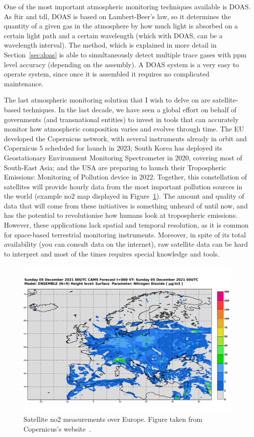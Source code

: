 One of the most important atmospheric monitoring techniques available is
\gls{DOAS}. As \gls{ftir} and \gls{tdl}, \gls{DOAS} is based on
Lambert-Beer's law, so it determines the quantity of a given gas in the
atmosphere by how much light is absorbed on a certain light path and a
certain wavelength (which with \gls{DOAS}, can be a wavelength
interval). The method, which is explained in more detail in
Section~\ref{sec:doas} is able to simultaneously detect multiple trace
gases with ppm level accuracy (depending on the assembly). A \gls{DOAS}
system is a very easy to operate system, since once it is assembled it
requires no complicated maintenance.

The last atmospheric monitoring solution that I wish to delve on are
satellite-based techniques. In the last decade, we have seen a global
effort on behalf of governments (and transnational entities) to invest in
tools that can accurately monitor how atmospheric composition varies and
evolves through time. The EU developed the Copernicus network, with
several instruments already in orbit and Copernicus 5 scheduled for
launch in 2023; South Korea has deployed its Geostationary Environment
Monitoring Spectrometer in 2020, covering most of South-East Asia; and
the USA are preparing to launch their Tropospheric Emissions: Monitoring
of Pollution device in 2022. Together, this constellation of satellites
will provide hourly data from the most important pollution sources in
the world (example \gls{no2} map displayed in
Figure~\ref{fig:ap_monitoring_copernicus}). The amount and quality of
data that will come from these initiatives is something unheard of until
now, and has the potential to revolutionise how humans look at
tropospheric emissions. However, these applications lack spatial and
temporal resolution, as it is common for space-based terrestrial
monitoring instruments. Moreover, in spite of its total availability
(you can consult data on the internet), raw satellite data can be hard
to interpret and most of the times requires special knowledge and tools.

\begin{figure}[htpb]
    \centering
    \includegraphics[width=.8\textwidth]{img/pdf/ENSEMBLE_no2_2021120500_SFC_000.pdf}
    \caption{Satellite \gls{no2} measurements over Europe. Figure taken
    from Copernicus's website~\cite{copernicusweb2021}.}%
    \label{fig:ap_monitoring_copernicus}
\end{figure}

